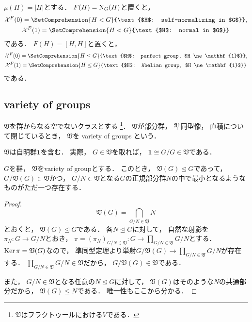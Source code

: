 \documentclass{jlreq}
\newcommand{\Term}[2][\relax]{%
	\textsf{#2} \if#1\relax\else{（\textsf{#1}）}\fi%
}
\newcommand{\Order}[1]{\left| #1 \right|}
\newcommand{\TrivGrp}{\mathbf{1}}
\begin{document}
	\begin{example}
		$\mu(H) = \Order{H}$とする．
		$F(H) = \Normalizer[G](H)$と置くと，
		\begin{gather}
			\mathcal{X}^F(0)
			= \SetComprehension{H < G}{\text{$H$: self-normalizing in $G$}}, \\
			\mathcal{X}^F(1)
			= \SetComprehension{H < G}{\text{$H$: normal in $G$}}
		\end{gather}
		である．
		$F(H) = [H, H]$と置くと，
		\begin{gather}
			\mathcal{X}^F(0)
			= \SetComprehension{H \le G}{\text{$H$: perfect group, $H \ne \TrivGrp$}}, \\
			\mathcal{X}^F(1)
			= \SetComprehension{H \le G}{\text{$H$: Abelian group, $H \ne \TrivGrp$}}
		\end{gather}
		である．
	\end{example}
	
	\subsection{variety of groups~\cite{MathStackExchange20220802}}
	
	\begin{definition}
		$\mathfrak{V}$を群からなる空でないクラスとする
		\footnote{$\mathfrak{V}$はフラクトゥールにおける$V$である．
		}．
		$\mathfrak{V}$が部分群，
		準同型像，
		直積について閉じているとき，
		$\mathfrak{V}$を\Term{variety of groups}という．
	\end{definition}
	
	$\mathfrak{V}$は自明群$\TrivGrp$を含む．
	実際，
	$G \in \mathfrak{V}$を取れば，
	$\TrivGrp \cong G/G \in \mathfrak{V}$である．
	
	\begin{proposition}\label{prop:variety_of_gps}
		$G$を群，
		$\mathfrak{V}$をvariety of groupとする．
		このとき，
		$\mathfrak{V}(G) \trianglelefteq G$であって，
		$G/\mathfrak{V}(G) \in \mathfrak{V}$かつ，
		$G/N \in \mathfrak{V}$となる$G$の正規部分群$N$の中で最小となるようなものがただ一つ存在する．
	\end{proposition}
	
	\begin{proof}
		\begin{equation}
			\mathfrak{V}(G)
			= \bigcap_{G/N \in \mathfrak{V}} N
		\end{equation}
		とおくと，
		$\mathfrak{V}(G) \trianglelefteq G$である．
		各$N \trianglelefteq G$に対して，
		自然な射影を$\pi_N \colon G \to G/N$とおき，
		$\pi = (\pi_N)_{G/N \in \mathfrak{V}} \colon G \to \prod_{G/N \in \mathfrak{V}} G/N$とする．
		$\Ker \pi = \mathfrak{V}(G)$なので，
		準同型定理より単射$G/\mathfrak{V}(G) \to \prod_{G/N \in \mathfrak{V}} G/N$が存在する．
		$\prod_{G/N \in \mathfrak{V}} G/N \in \mathfrak{V}$だから，
		$G/\mathfrak{V}(G) \in \mathfrak{V}$である．
		
		また，
		$G/N \in \mathfrak{V}$となる任意の$N \trianglelefteq G$に対して，
		$\mathfrak{V}(G)$はそのような$N$の共通部分だから，
		$\mathfrak{V}(G) \le N$である．
		唯一性もここから分かる．
	\end{proof}
	
\end{document}
